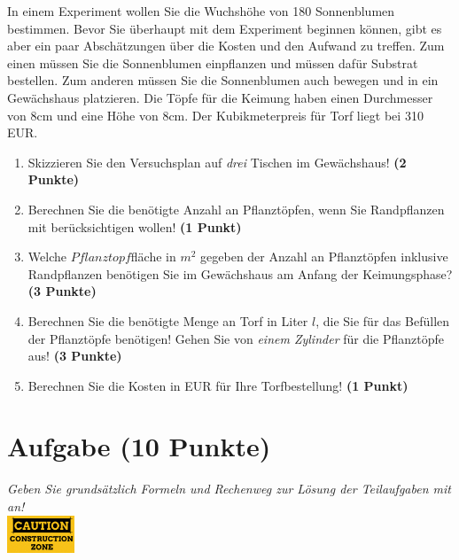 \documentclass[a4paper, 10pt]{scrartcl}\usepackage[]{graphicx}\usepackage[]{xcolor}
\begin{document}
In einem Experiment wollen Sie die Wuchsh{\"o}he von 180
Sonnenblumen bestimmen. Bevor Sie {\"u}berhaupt mit dem Experiment beginnen
k{\"o}nnen, gibt es aber ein paar Absch{\"a}tzungen {\"u}ber die Kosten und den Aufwand
zu treffen. Zum einen m{\"u}ssen Sie die Sonnenblumen einpflanzen und m{\"u}ssen
daf{\"u}r Substrat bestellen. Zum anderen m{\"u}ssen Sie die Sonnenblumen auch
bewegen und in ein Gew{\"a}chshaus platzieren. Die T{\"o}pfe f{\"u}r die Keimung haben
einen Durchmesser von 8cm und eine H{\"o}he von 8cm. Der
Kubikmeterpreis f{\"u}r Torf liegt bei 310 EUR.

\begin{enumerate}
\item Skizzieren Sie den Versuchsplan auf \textit{drei} Tischen im
  Gew{\"a}chshaus! \textbf{(2 Punkte)}
\item Berechnen Sie die ben{\"o}tigte Anzahl an Pflanzt{\"o}pfen, wenn Sie
  Randpflanzen mit ber{\"u}cksichtigen wollen! \textbf{(1 Punkt)}
\item Welche $Pflanztopf$fl{\"a}che in $m^2$ gegeben der Anzahl an
  Pflanzt{\"o}pfen inklusive Randpflanzen ben{\"o}tigen Sie im Gew{\"a}chshaus am
  Anfang der Keimungsphase?  \textbf{(3 Punkte)}
\item Berechnen Sie die ben{\"o}tigte Menge an Torf in Liter $l$, die Sie f{\"u}r
  das Bef{\"u}llen der Pflanzt{\"o}pfe ben{\"o}tigen! Gehen Sie von \textit{einem
    Zylinder} f{\"u}r die Pflanzt{\"o}pfe aus!  \textbf{(3 Punkte)}
\item Berechnen Sie die Kosten in EUR f{\"u}r Ihre Torfbestellung! \textbf{(1
    Punkt)}
\end{enumerate}



 
\clearpage

\section{Aufgabe \hfill (10 Punkte)}

\textit{Geben Sie grunds{\"a}tzlich Formeln und Rechenweg zur L{\"o}sung der
  Teilaufgaben mit an!} \\[1Ex]

\hfill\href{}{\includegraphics[width = 2cm]{img/caution}} %
\hspace{2Ex}
\end{document}
